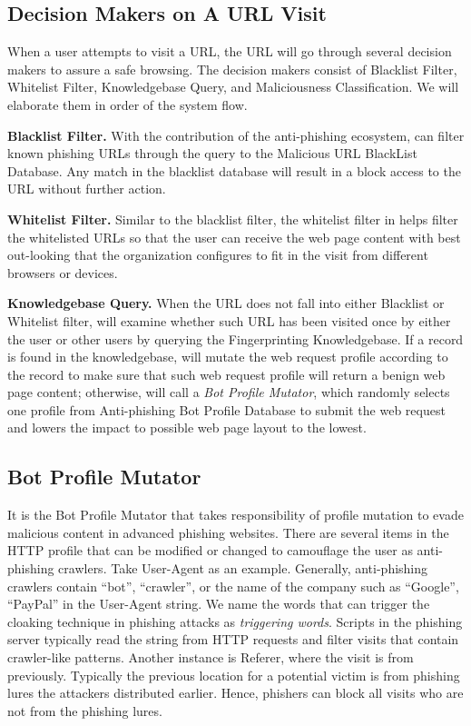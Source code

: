 \subsection{Decision Makers on A URL Visit}

When a user attempts to visit a URL, the URL will go through several decision makers to assure a safe browsing.
The decision makers consist of Blacklist Filter, Whitelist Filter, Knowledgebase Query, and Maliciousness Classification.
We will elaborate them in order of the system flow.

\noindent
\textbf{Blacklist Filter.}
With the contribution of the anti-phishing ecosystem, \spartacus can filter known phishing URLs through the query to the Malicious URL BlackList Database.
Any match in the blacklist database will result in a block access to the URL without further action.

\noindent
\textbf{Whitelist Filter.}
Similar to the blacklist filter, the whitelist filter in \spartacus helps filter the whitelisted URLs so that the user can receive the web page content with best out-looking that the organization configures to fit in the visit from different browsers or devices.

\noindent
\textbf{Knowledgebase Query.}
When the URL does not fall into either Blacklist or Whitelist filter, \spartacus will examine whether such URL has been visited once by either the user or other users by querying the Fingerprinting Knowledgebase.
If a record is found in the knowledgebase, \spartacus will mutate the web request profile according to the record to make sure that such web request profile will return a benign web page content;
otherwise, \spartacus will call a \emph{Bot Profile Mutator}, which randomly selects one profile from Anti-phishing Bot Profile Database to submit the web request and lowers the impact to possible web page layout to the lowest.



\subsection{Bot Profile Mutator}

It is the Bot Profile Mutator that takes responsibility of profile mutation to evade malicious content in advanced phishing websites.
There are several items in the HTTP profile that can be modified or changed to camouflage the user as anti-phishing crawlers.
Take User-Agent as an example. 
Generally, anti-phishing crawlers contain ``bot'', ``crawler'', or the name of the company such as ``Google'', ``PayPal'' in the User-Agent string.
We name the words that can trigger the cloaking technique in phishing attacks as \emph{triggering words}.
Scripts in the phishing server typically read the string from HTTP requests and filter visits that contain crawler-like patterns.
Another instance is Referer, where the visit is from previously.
Typically the previous location for a potential victim is from phishing lures the attackers distributed earlier.
Hence, phishers can block all visits who are not from the phishing lures.

